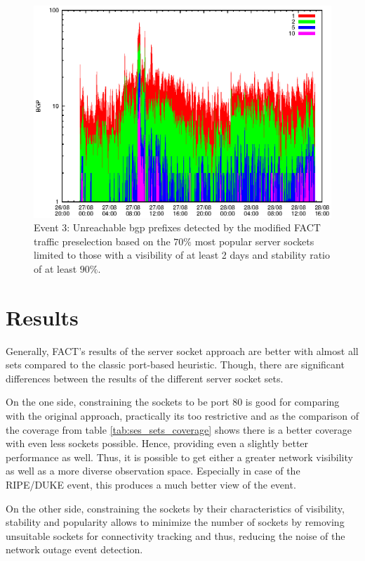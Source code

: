 \begin{figure}
	[p] \centering 
	\includegraphics[width=0.75\linewidth]{images/events/2010_08_27/bgp_log_Set_var_0_1_stab_9_vts_2.eps} \caption{Event 3: Unreachable \gls{bgp} prefixes detected by the modified \gls{FACT} traffic preselection based on the $70\%$ most popular \glspl{server socket} limited to those with a visibility of at least 2 days and stability ratio of at least $90\%$.} 
	\label{fig:RIPE_FACT_popularVTS2STAB9} 
\end{figure}

\newpage 
\section{Results\label{section:results}} 
Generally, \gls{FACT}'s results of the \gls{server socket} approach are better with almost all sets compared to the classic port-based heuristic. 
Though, there are significant differences between the results of the different \gls{server socket} sets. 

On the one side, constraining the sockets to be port 80 is good for comparing with the original approach, practically its too restrictive and as the comparison of the coverage from table \ref{tab:ses_sets_coverage} shows there is a better coverage with even less sockets possible. Hence, providing even a slightly better performance as well. 
Thus, it is possible to get either a greater network visibility as well as a more diverse observation space. Especially in case of the RIPE/DUKE event, this produces a much better view of the event. 

On the other side, constraining the sockets by their characteristics of visibility, stability and popularity allows to minimize the number of sockets by removing unsuitable sockets for connectivity tracking and thus, reducing the noise of the network outage event detection.


